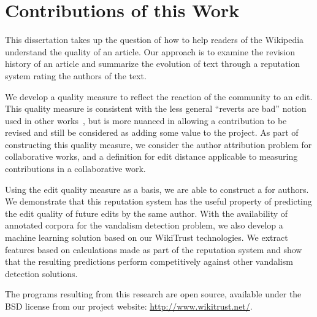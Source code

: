 \section{Contributions of this Work}

This dissertation takes up the question of how to help readers of the
Wikipedia understand the quality of an article.
Our approach is to examine the revision history of an article
and summarize the evolution of text through a reputation system
rating the authors of the text.

We develop a quality measure to reflect the reaction of
the community to an edit.
This quality measure is consistent with the less general
``reverts are bad'' notion used in other
works~\cite{Smets2008,Itakura2009,Belani2010,West2010},
but is more nuanced in allowing a contribution to be revised
and still be considered as adding some value to the project.
As part of constructing this quality measure, we consider the
author attribution problem for collaborative works,
and a definition for edit distance applicable to
measuring contributions in a collaborative work.

Using the edit quality measure as a basis, we are able
to construct a  for authors.
We demonstrate that this reputation system has the useful property
of predicting the edit quality of future edits by the same
author.
With the availability of annotated corpora for the vandalism
detection problem, we also develop a machine learning solution based on our
WikiTrust technologies.
We extract features based on calculations made as part of the
reputation system and show that the resulting predictions perform
competitively against other vandalism detection solutions.

The programs resulting from this research are open source,
available under the BSD license from our project website:
\url{http://www.wikitrust.net/}.

